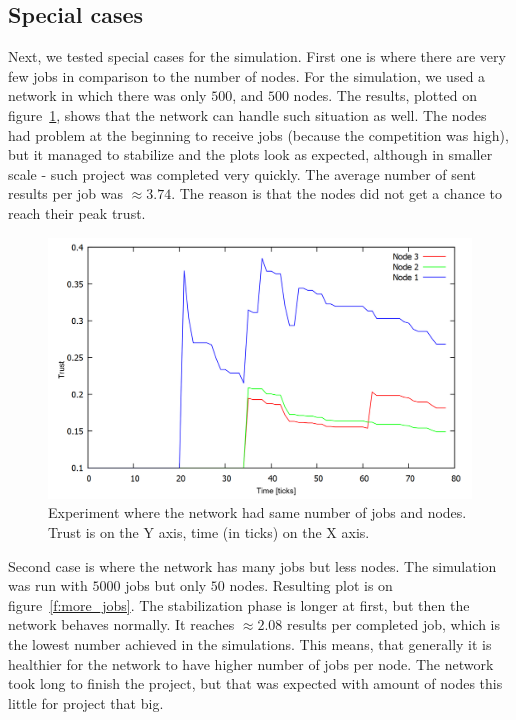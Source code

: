 \FloatBarrier

\subsection{Special cases}

Next, we tested special cases for the simulation. First one is where there are very few jobs in comparison to the number of nodes. For the simulation, we used a network in which there was only $500$, and $500$ nodes. The results, plotted on figure~\ref{f:less_jobs}, shows that the network can handle such situation as well. The nodes had problem at the beginning to receive jobs (because the competition was high), but it managed to stabilize and the plots look as expected, although in smaller scale - such project was completed very quickly. The average number of sent results per job was $\approx 3.74$. The reason is that the nodes did not get a chance to reach their peak trust.

\begin{figure}
\centering
\includegraphics[width=\textwidth]{diagrams/trust_less_jobs.png}
\caption{Experiment where the network had same number of jobs and nodes. Trust is on the Y axis, time (in ticks) on the X axis.}
\label{f:less_jobs}
\end{figure}

Second case is where the network has many jobs but less nodes. The simulation was run with $5000$ jobs but only $50$ nodes. Resulting plot is on figure~\ref{f:more_jobs}. The stabilization phase is longer at first, but then the network behaves normally. It reaches $\approx 2.08$ results per completed job, which is the lowest number achieved in the simulations. This means, that generally it is healthier for the network to have higher number of jobs per node. The network took long to finish the project, but that was expected with amount of nodes this little for project that big.

